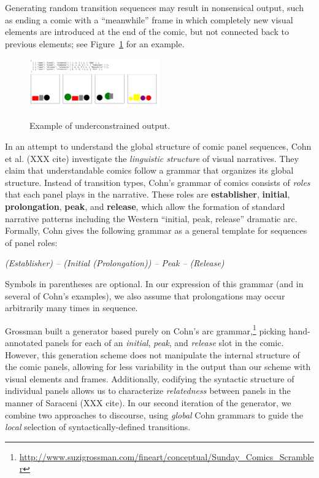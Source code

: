 Generating random transition sequences may result in nonsensical output,
such as ending a comic with a ``meanwhile'' frame in which completely new
visual elements are introduced at the end of the comic, but not connected
back to previous elements; see Figure~\ref{fig:outbad} for an example. 

\begin{figure}
\caption{Example of underconstrained output.}
\includegraphics[width=0.5\textwidth]{comicgen-underconstrained-2.png}
\label{fig:outbad}
\end{figure}

In an attempt to understand the global structure of comic panel sequences,
Cohn et al. (XXX cite) investigate the {\em linguistic structure} of
visual narratives. They claim that understandable comics follow a grammar
that organizes its global structure. Instead of transition types, Cohn's
grammar of comics consists of {\em roles} that each panel plays in the
narrative. These roles are {\bf establisher}, {\bf initial}, {\bf
prolongation}, {\bf peak}, and {\bf release}, which allow the formation of
standard narrative patterns including the Western ``initial, peak,
release'' dramatic arc. Formally, Cohn gives the following grammar 
as a general template for sequences of panel roles:

{\it
(Establisher) -- (Initial (Prolongation)) -- Peak -- (Release)}

Symbols in parentheses are optional. In our expression of this grammar (and
in several of Cohn's examples), we also assume that prolongations may occur
arbitrarily many times in sequence.

Grossman built a generator based purely on Cohn's arc grammar,\footnote{
  \url{http://www.suzigrossman.com/fineart/conceptual/Sunday_Comics_Scrambler}
}
picking hand-annotated panels for each of an {\em initial},
{\em peak}, and {\em release} slot in the comic. However, this generation
scheme does not manipulate the internal structure of the comic panels,
allowing for less variability in the output than our scheme with visual
elements and frames. Additionally, codifying the syntactic structure of
individual panels allows us to characterize {\em relatedness} between
panels in the manner of Saraceni (XXX cite). In our second iteration of the
generator, we combine two approaches to discourse, using {\em global} Cohn
grammars to guide the {\em local} selection of syntactically-defined
transitions.

